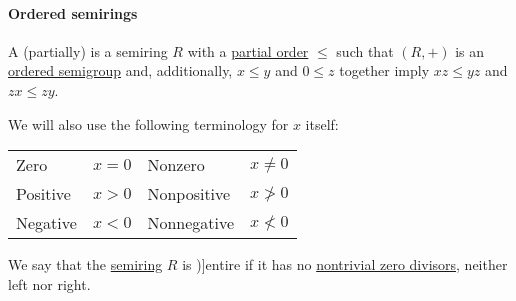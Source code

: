 \paragraph{Ordered semirings}

\begin{definition}\label{def:ordered_semiring}
  A (partially)  is a semiring \( R \) with a \hyperref[def:partially_ordered_set]{partial order} \( \leq \) such that \( (R, +) \) is an \hyperref[def:ordered_semigroup]{ordered semigroup} and, additionally, \( x \leq y \) and \( 0 \leq z \) together imply \( xz \leq yz \) and \( zx \leq zy \).

  We will also use the following terminology for \( x \) itself:
  \begin{center}
    \begin{tabular}{l | l || l | l}
      Zero        & \( x = 0 \) & Nonzero     & \( x \neq 0 \) \\
      Positive    & \( x > 0 \) & Nonpositive & \( x \not> 0 \) \\
      Negative    & \( x < 0 \) & Nonnegative & \( x \not< 0 \)
    \end{tabular}
  \end{center}
\end{definition}

\begin{definition}\label{def:entire_semiring}
  We say that the \hyperref[def:semiring]{semiring} \( R \) is \term[ru=кольцо без делителей нуля (\cite[108]{Мальцев1970})]{entire} if it has no \hyperref[def:divisibility]{nontrivial zero divisors}, neither left nor right.
\end{definition}

